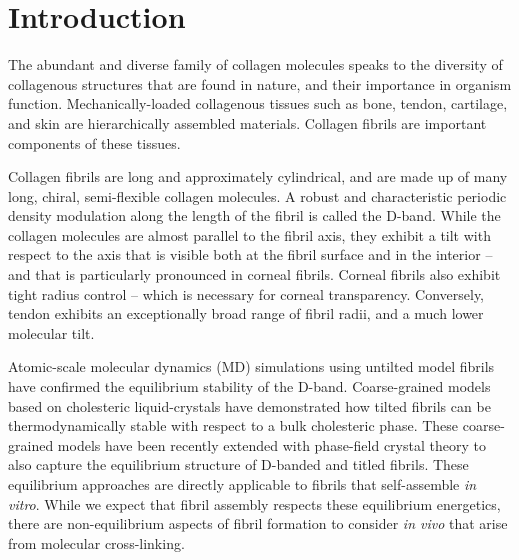 \documentclass[twoside,twocolumn,9pt]{article}
\begin{document}
\section*{}
\vspace{-1cm}


\section{Introduction} %
The abundant and diverse family of collagen molecules \cite{Ricard-Blum:2011} speaks to the diversity of collagenous structures that are found in nature, and their importance in organism function. Mechanically-loaded collagenous tissues such as bone, tendon, cartilage, and skin are hierarchically assembled materials.\cite{Sherman:2015} Collagen fibrils are  important components of these tissues.

Collagen fibrils are long and approximately cylindrical, and are made up of many long, chiral, semi-flexible collagen molecules.\cite{Rezaei:2018} A robust and characteristic periodic density modulation along the length of the fibril is called the D-band.\cite{Fang:2012, Quan:2015} While the collagen molecules are almost parallel to the fibril axis, they exhibit a  tilt with respect to the axis that is visible both at the fibril surface \cite{Raspanti:2018} and in the interior \cite{Holmes:2001, Bell:2018} -- and that is particularly pronounced in corneal fibrils.  Corneal fibrils also exhibit tight radius control -- which is necessary for corneal transparency.\cite{Meek:2015} Conversely, tendon exhibits an exceptionally broad range of fibril radii,\cite{Parry:1978, PattersonKane:1997, Goh:2012, Kalson:2015} and a much lower molecular tilt.\cite{Reale:1981, Raspanti:2018}

Atomic-scale molecular dynamics (MD) simulations using untilted model fibrils have confirmed the equilibrium stability of the D-band.\cite{Zhou:2016, Xu:2018} Coarse-grained models based on cholesteric liquid-crystals \cite{Brown:2014, Cameron:2018} have demonstrated how tilted fibrils can be thermodynamically stable with respect to a bulk cholesteric phase. These coarse-grained models have been recently extended with phase-field crystal theory to also capture the equilibrium structure of D-banded and titled fibrils.\cite{Cameron:2020} These equilibrium approaches are directly applicable to fibrils that self-assemble \emph{in vitro}.\cite{Harris:2013, Gobeaux:2008} While we expect that fibril assembly  respects these equilibrium energetics, there are non-equilibrium aspects of fibril formation to consider \emph{in vivo} that arise from molecular cross-linking.
\end{document}
